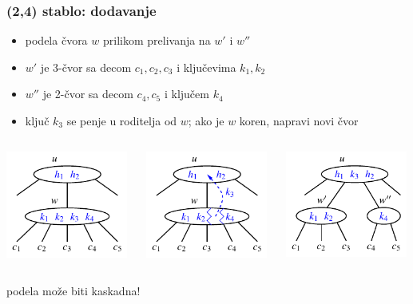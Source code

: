 \documentclass[compress]{beamer}
\begin{document}
\begin{frame}[fragile]
  \frametitle{(2,4) stablo: dodavanje}
  \begin{itemize}
    \item podela čvora $w$ prilikom prelivanja na $w'$ i $w''$
    \item $w'$ je 3-čvor sa decom $c_1, c_2, c_3$ i ključevima $k_1, k_2$
    \item $w''$ je 2-čvor sa decom $c_4, c_5$ i ključem $k_4$
    \item ključ $k_3$ se penje u roditelja od $w$; ako je $w$ koren, napravi novi čvor 
  \end{itemize}
  \begin{columns}
    \begin{column}[c]{4cm}
      \begin{center}
        \includegraphics[width=4cm]{asp-11-pic31.pdf}
      \end{center}
    \end{column}
    \begin{column}[c]{4cm}
      \begin{center}
        \includegraphics[width=4cm]{asp-11-pic32.pdf}
      \end{center}
    \end{column}
    \begin{column}[c]{4cm}
      \begin{center}
        \includegraphics[width=4cm]{asp-11-pic33.pdf}
      \end{center}
    \end{column}
  \end{columns}
  podela može biti kaskadna!
\end{frame}
\end{document}
